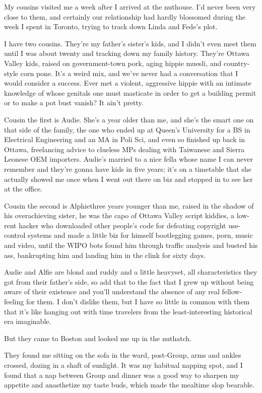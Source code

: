 My cousins visited me a week after I arrived at the nuthouse. I’d
never been very close to them, and certainly our relationship had
hardly blossomed during the week I spent in Toronto, trying to
track down Linda and Fede’s plot.

I have two cousins. They’re my father’s sister’s kids, and I didn’t
even meet them until I was about twenty and tracking down my family
history. They’re Ottawa Valley kids, raised on government-town
pork, aging hippie muesli, and country-style corn pone. It’s a
weird mix, and we’ve never had a conversation that I would consider
a success. Ever met a violent, aggressive hippie with an intimate
knowledge of whose genitals one must masticate in order to get a
building permit or to make a pot bust vanish? It ain’t pretty.

Cousin the first is Audie. She’s a year older than me, and she’s
the smart one on that side of the family, the one who ended up at
Queen’s University for a BS in Electrical Engineering and an MA in
Poli Sci, and even so finished up back in Ottawa, freelancing
advice to clueless MPs dealing with Taiwanese and Sierra Leonese
OEM importers. Audie’s married to a nice fella whose name I can
never remember and they’re gonna have kids in five years; it’s on a
timetable that she actually showed me once when I went out there on
biz and stopped in to see her at the office.

Cousin the second is Alphie{\dash}three years younger than me, raised in
the shadow of his overachieving sister, he was the capo of Ottawa
Valley script kiddies, a low-rent hacker who downloaded other
people’s code for defeating copyright use-control systems and made
a little biz for himself bootlegging games, porn, music and video,
until the WIPO bots found him through traffic analysis and busted
his ass, bankrupting him and landing him in the clink for sixty
days.

Audie and Alfie are blond and ruddy and a little heavyset, all
characteristics they got from their father’s side, so add that to
the fact that I grew up without being aware of their existence and
you’ll understand the absence of any real fellow-feeling for them.
I don’t dislike them, but I have so little in common with them that
it’s like hanging out with time travelers from the
least-interesting historical era imaginable.

But they came to Boston and looked me up in the nuthatch.

They found me sitting on the sofa in the ward, post-Group, arms and
ankles crossed, dozing in a shaft of sunlight. It was my habitual
napping spot, and I found that a nap between Group and dinner was a
good way to sharpen my appetite and anasthetize my taste buds,
which made the mealtime slop bearable.

